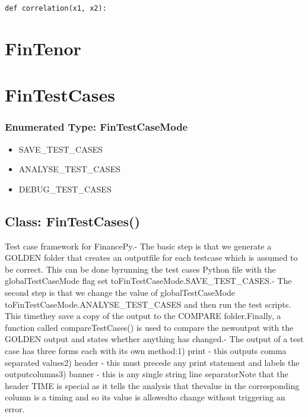 \documentclass[twoside,11pt]{book}
\begin{document}
\begin{lstlisting}
def correlation(x1, x2):
\end{lstlisting}

\newpage
\section{FinTenor}

\newpage
\section{FinTestCases}

\subsubsection{Enumerated Type: FinTestCaseMode}
\begin{itemize}
\item{SAVE\_TEST\_CASES}
\item{ANALYSE\_TEST\_CASES}
\item{DEBUG\_TEST\_CASES}
\end{itemize}

\subsection{Class: FinTestCases()}
Test case framework for FinancePy.- The basic step is that we generate a GOLDEN folder that creates an outputfile for each testcase which is assumed to be correct. This can be done byrunning the test cases Python file with the globalTestCaseMode flag set toFinTestCaseMode.SAVE\_TEST\_CASES.- The second step is that we change the value of globalTestCaseMode toFinTestCaseMode.ANALYSE\_TEST\_CASES and then run the test scripts. This timethey save a copy of the output to the COMPARE folder.Finally, a function called compareTestCases() is used to compare the newoutput with the GOLDEN output and states whether anything has changed.- The output of a test case has three forms each with its own method:1) print - this outputs comma separated values2) header - this must precede any print statement and labels the outputcolumns3) banner - this is any single string line separatorNote that the header TIME is special as it tells the analysis that thevalue in the corresponding column is a timing and so its value is allowedto change without triggering an error.
\end{document}
